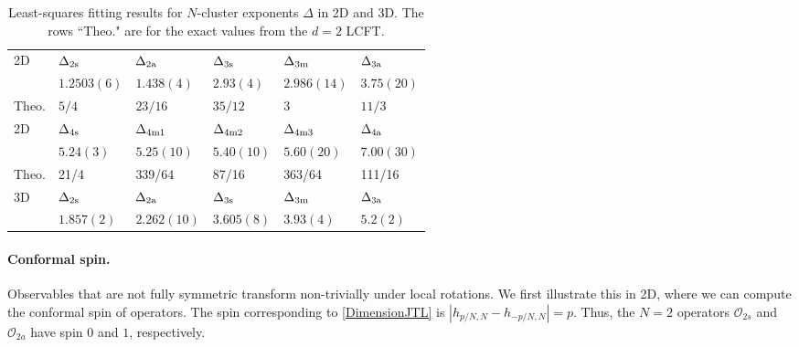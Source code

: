 \documentclass[aps,prl,twocolumn,showpacs,superscriptaddress,groupedaddress]{revtex4}  %
\begin{document}
\begin{table}[htbp]
\caption{\label{tab:exponent} Least-squares fitting results for $N$-cluster exponents $\Delta$ in 2D and 3D. The rows ``Theo." 
    are for the exact values from the $d=2$ LCFT. }
\begin{ruledtabular}
\begin{tabular}{llllll}
 2D      & $\Delta_{\rm 2s}$       & $\Delta_{\rm 2a}$      & $\Delta_{\rm 3s}$        & $\Delta_{\rm 3m}$     & $\Delta_{\rm 3a}$      \\
            & $1.2503(6)$        & $1.438 (4)$         & $2.93(4)$             & $2.986(14)$        & $3.75(20)$            \\ 
 Theo.   & $5/4$                  & $23/16$               & $35/12$                & $3$                      & $11/3$              \\
 \hline 
 2D      & $\Delta_{\rm 4s}$      & $\Delta_{\rm 4m1}$     & $\Delta_{\rm 4m2}$    & $\Delta_{\rm 4m3}$     & $\Delta_{\rm 4a}$           \\
           & $5.24(3)$           & $5.25(10)$              & $5.40(10)$            & $5.60(20)$           & $7.00(30)$           \\
    Theo.   &  21/4       & 339/64     & 87/16   & 363/64   & 111/16          \\
 \hline
 3D      & $\Delta_{\rm 2s}$     & $\Delta_{\rm 2a}$          & $\Delta_{\rm 3s}$     & $\Delta_{\rm 3m}$        & $\Delta_{\rm 3a}$ \\
            & $1.857(2)$        & $2.262(10)$            & $3.605(8)$        & $3.93(4)$               & $5.2(2)$ 
\end{tabular}
\end{ruledtabular}
\end{table}

\paragraph{Conformal spin.}

Observables that are not fully symmetric transform non-trivially under local rotations.
We first illustrate this in 2D, where we can compute the conformal spin of operators.
The spin corresponding to \eqref{DimensionJTL} is $|h_{p/N,N}-h_{-p/N,N}|=p$.
Thus, the $N=2$ operators $\mathcal{O}_{2s}$ and $\mathcal{O}_{2a}$ have spin $0$ and $1$, respectively.
\end{document}
